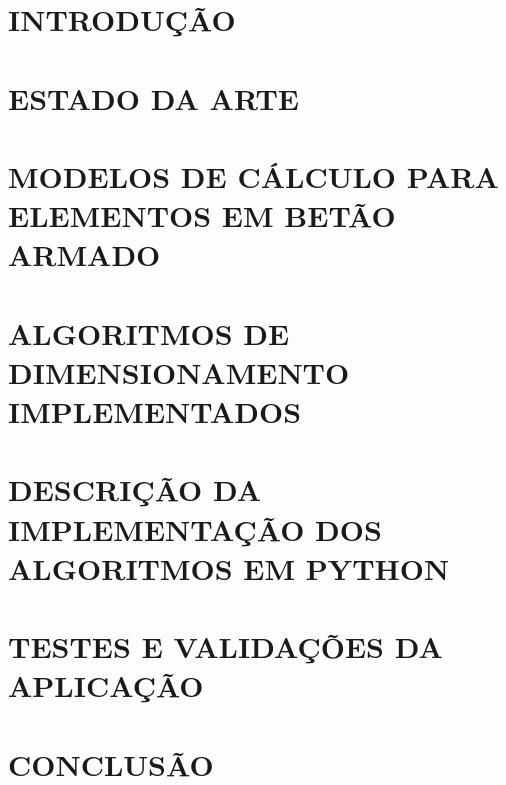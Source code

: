\documentclass[10pt]{article}
\begin{document}
\section{INTRODUÇÃO}


\newpage
\section{ESTADO DA ARTE}


\newpage
\section{MODELOS DE CÁLCULO PARA ELEMENTOS EM BETÃO ARMADO}


\newpage
\section{ALGORITMOS DE DIMENSIONAMENTO IMPLEMENTADOS}


\newpage
\section{DESCRIÇÃO DA IMPLEMENTAÇÃO DOS ALGORITMOS EM PYTHON}


\newpage
\section{TESTES E VALIDAÇÕES DA APLICAÇÃO}


\newpage
\section{CONCLUSÃO}



\newpage
\printbibliography[heading=bibintoc,title={REFERÊNCIAS BIBLIOGRÁFICAS}]

\newpage

\end{document}
